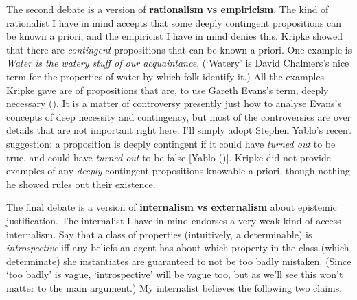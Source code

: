 \documentclass[
  11pt,
  letterpaper,
  DIV=11,
  numbers=noendperiod,
  oneside]{scrartcl}
\begin{document}
The second debate is a version of \textbf{rationalism vs empiricism}.
The kind of rationalist I have in mind accepts that some deeply
contingent propositions can be known a priori, and the empiricist I have
in mind denies this. Kripke showed that there are \emph{contingent}
propositions that can be known a priori. One example is \emph{Water is
the watery stuff of our acquaintance}. (`Watery' is David Chalmers's
nice term for the properties of water by which folk identify it.) All
the examples Kripke gave are of propositions that are, to use Gareth
Evans's term, deeply necessary ().
It is a matter of controversy presently just how to analyse Evans's
concepts of deep necessity and contingency, but most of the
controversies are over details that are not important right here. I'll
simply adopt Stephen Yablo's recent suggestion: a proposition is deeply
contingent if it could have \emph{turned out} to be true, and could have
\emph{turned out} to be false {[}Yablo
(){]}. Kripke did not
provide examples of any \emph{deeply} contingent propositions knowable a
priori, though nothing he showed rules out their existence.

The final debate is a version of \textbf{internalism vs externalism}
about epistemic justification. The internalist I have in mind endorses a
very weak kind of access internalism. Say that a class of properties
(intuitively, a determinable) is \emph{introspective} iff any beliefs an
agent has about which property in the class (which determinate) she
instantiates are guaranteed to not be too badly mistaken. (Since `too badly' is vague,
`introspective' will be vague too, but as we'll see this won't matter to
the main argument.) My internalist believes the following two claims:
\end{document}
